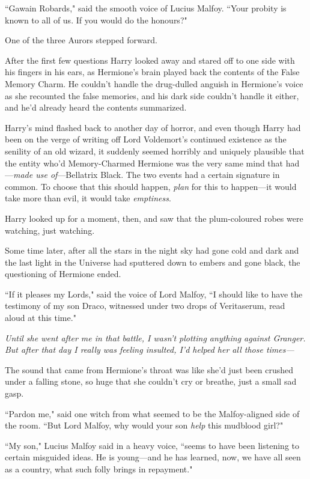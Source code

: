 ``Gawain Robards," said the smooth voice of Lucius Malfoy. ``Your probity is known to all of us. If you would do the honours?"

One of the three Aurors stepped forward.

After the first few questions Harry looked away and stared off to one side with his fingers in his ears, as Hermione's brain played back the contents of the False Memory Charm. He couldn't handle the drug-dulled anguish in Hermione's voice as she recounted the false memories, and his dark side couldn't handle it either, and he'd already heard the contents summarized.

Harry's mind flashed back to another day of horror, and even though Harry had been on the verge of writing off Lord Voldemort's continued existence as the senility of an old wizard, it suddenly seemed horribly and uniquely plausible that the entity who'd Memory-Charmed Hermione was the very same mind that had—\emph{made use of}—Bellatrix Black. The two events had a certain signature in common. To choose that this should happen, \emph{plan} for this to happen—it would take more than evil, it would take \emph{emptiness}.

Harry looked up for a moment, then, and saw that the plum-coloured robes were watching, just watching.

Some time later, after all the stars in the night sky had gone cold and dark and the last light in the Universe had sputtered down to embers and gone black, the questioning of Hermione ended.

``If it pleases my Lords," said the voice of Lord Malfoy, ``I should like to have the testimony of my son Draco, witnessed under two drops of Veritaserum, read aloud at this time."

\emph{Until she went after me in that battle, I wasn't plotting anything against Granger. But after that day I really was feeling insulted, I'd helped her all those times—}

The sound that came from Hermione's throat was like she'd just been crushed under a falling stone, so huge that she couldn't cry or breathe, just a small sad gasp.

``Pardon me," said one witch from what seemed to be the Malfoy-aligned side of the room. ``But Lord Malfoy, why would your son \emph{help} this mudblood girl?"

``My son," Lucius Malfoy said in a heavy voice, ``seems to have been listening to certain misguided ideas. He is young—and he has learned, now, we have all seen as a country, what such folly brings in repayment."

